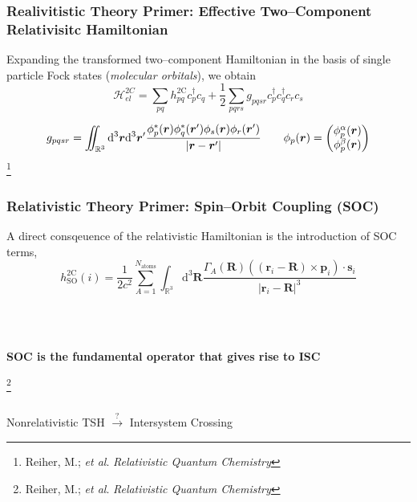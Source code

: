 \documentclass[usepdftitle=false,10pt]{beamer}
\newcommand*\vc[1]{\boldsymbol{#1}}
\newcommand*\op[1]{\mathcal{#1}}
\renewcommand*\iint[0]{\int\hspace{-8pt}\int}
\newcommand\blfootnote[1]{%
  \begingroup
  \renewcommand\thefootnote{}\footnote{#1}%
  \addtocounter{footnote}{-1}%
  \endgroup
}
\begin{document}
\begin{frame}
  \frametitle{Realivitistic Theory Primer: Effective Two--Component Relativisitc
  Hamiltonian}

  Expanding the transformed two--component Hamiltonian in the basis of single
  particle Fock states (\emph{molecular orbitals}), we obtain
  \begin{equation*}
    \op{H}^{2C}_{el} = \sum_{pq}h^\mathrm{2C}_{pq} c_p^\dagger c_q +
    \frac{1}{2}\sum_{pqrs} g_{pqsr}c_p^\dagger c_q^\dagger c_r c_s
  \end{equation*}

  \begin{equation*}
    g_{pqsr} = \iint_{\mathbb{R}^3}\mathrm{d}^3\vc{r} \mathrm{d}^3\vc{r}'
      \frac{\phi^*_p(\vc{r})\phi^*_q(\vc{r}')\phi_s(\vc{r})\phi_r(\vc{r}')}
           {\vert \vc{r} - \vc{r}' \vert} \qquad 
    \phi_p(\vc{r}) = 
      \begin{pmatrix} \phi^\alpha_p(\vc{r}) \\ \phi^\beta_p(\vc{r}) \end{pmatrix}
  \end{equation*}
  \blfootnote{\tiny Reiher, M.; \emph{et al}. \emph{Relativistic Quantum Chemistry}}

\end{frame}

\begin{frame}
  \frametitle{Relativistic Theory Primer: Spin--Orbit Coupling (SOC)}

  A direct consqeuence of the relativistic Hamiltonian is the introduction of SOC terms,
  \begin{equation*}
    h^\mathrm{2C}_\mathrm{SO} (i) = \frac{1}{2c^2} \sum_{A=1}^{N_\mathrm{atoms}}
      \int_{\mathbb{R}^3}\mathrm{d}^3\vc{R}
      \frac{\Gamma_A(\vc{R})
        (( \vc{r}_i - \vc{R} ) \times \vc{p}_i)\cdot \vc{s}_i}
	{\vert \vc{r}_i - \vc{R} \vert^3}
  \end{equation*}

  ~\\
  ~\\
  \begin{center}
  {\LARGE \bf SOC is the fundamental operator that gives rise to ISC}
  \end{center}
  \blfootnote{\tiny Reiher, M.; \emph{et al}. \emph{Relativistic Quantum Chemistry}}
\end{frame}

\begin{frame}
\frametitle{}
\begin{center}
{\LARGE
  Nonrelativistic TSH $\xrightarrow{?}$ Intersystem Crossing
}
\end{center}
\end{frame}
\end{document}
